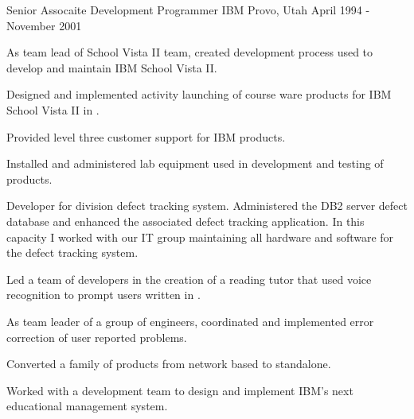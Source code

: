 \begin{cventries}
  \cventry
    {Senior Assocaite Development Programmer} %
    {IBM} %
    {Provo, Utah} %
    {April 1994 - November 2001} %
    {
  	  \begin{cvitems} %
  		  \item {As team lead of School Vista II team, created development process used to develop and maintain IBM School Vista II.}
  		  \item {Designed and implemented activity launching of course ware products for IBM School Vista II in \Cpp{}.}
  		  \item {Provided level three customer support for IBM products.}
  		  \item {Installed and administered lab equipment used in development and testing of products.}
  		  \item {Developer for division defect tracking system. Administered the DB2 server defect database and enhanced the associated defect tracking application. In this capacity I worked with our IT group maintaining all hardware and software for the defect tracking system.}
  		  \item {Led a team of developers in the creation of a reading tutor that used voice recognition to prompt users written in \Cpp{}.}
  		  \item {As team leader of a group of engineers, coordinated and implemented error correction of user reported problems.}
  		  \item {Converted a family of products from network based to standalone.}
  		  \item {Worked with a development team to design and implement IBM's next educational management system.}
  	  \end{cvitems}
    }
\end{cventries}
